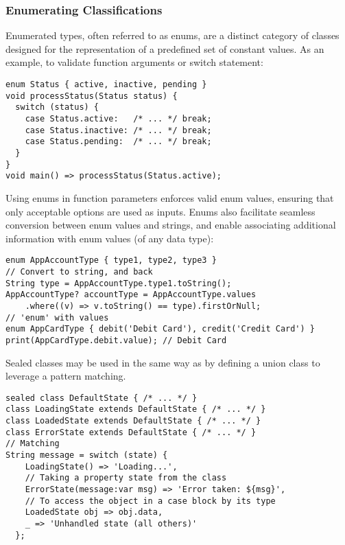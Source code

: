\newpage
\subsubsection{Enumerating Classifications}

Enumerated types, often referred to as enums, are a distinct category of classes designed for the representation of a 
predefined set of constant values. As an example, to validate function arguments or switch statement:

\begin{lstlisting}
enum Status { active, inactive, pending }
void processStatus(Status status) {
  switch (status) {
    case Status.active:   /* ... */ break;
    case Status.inactive: /* ... */ break;
    case Status.pending:  /* ... */ break;
  }
}
void main() => processStatus(Status.active);
\end{lstlisting}

\noindent Using enums in function parameters enforces valid enum values, ensuring that only acceptable options are used 
as inputs. Enums also facilitate seamless conversion between enum values and strings, and enable associating additional 
information with enum values (of any data type):

\begin{lstlisting}
enum AppAccountType { type1, type2, type3 }
// Convert to string, and back
String type = AppAccountType.type1.toString();
AppAccountType? accountType = AppAccountType.values
    .where((v) => v.toString() == type).firstOrNull;
// 'enum' with values
enum AppCardType { debit('Debit Card'), credit('Credit Card') }
print(AppCardType.debit.value); // Debit Card
\end{lstlisting}

\noindent Sealed classes may be used in the same way as  by defining a union class to leverage a pattern matching.

\begin{lstlisting}
sealed class DefaultState { /* ... */ }
class LoadingState extends DefaultState { /* ... */ }
class LoadedState extends DefaultState { /* ... */ }
class ErrorState extends DefaultState { /* ... */ }
// Matching
String message = switch (state) {
    LoadingState() => 'Loading...',
    // Taking a property state from the class
    ErrorState(message:var msg) => 'Error taken: ${msg}',
    // To access the object in a case block by its type 
    LoadedState obj => obj.data,    
    _ => 'Unhandled state (all others)'
  };
\end{lstlisting}


